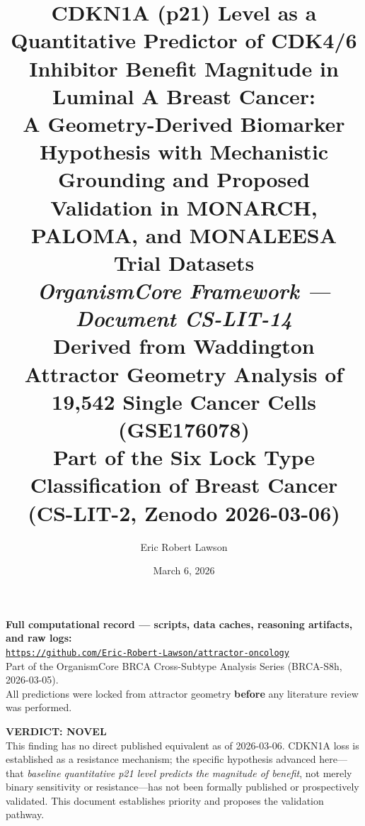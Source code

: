 \documentclass[12pt, a4paper]{article}
\title{
    \vspace{-1em}
    \textbf{CDKN1A (p21) Level as a Quantitative
    Predictor of CDK4/6 Inhibitor Benefit Magnitude
    in Luminal A Breast Cancer:}\\[0.5em]
    \large A Geometry-Derived Biomarker Hypothesis
    with Mechanistic Grounding and Proposed
    Validation in MONARCH, PALOMA, and
    MONALEESA Trial Datasets\\[0.4em]
    \normalsize \textit{OrganismCore Framework ---
    Document CS-LIT-14}\\[0.3em]
    \small Derived from Waddington Attractor Geometry
    Analysis of 19,542 Single Cancer Cells (GSE176078)\\[0.3em]
    \small Part of the Six Lock Type Classification
    of Breast Cancer (CS-LIT-2, Zenodo 2026-03-06)
}
\author[1]{Eric Robert Lawson}
\affil[1]{
    OrganismCore\\
    \href{mailto:OrganismCore@proton.me}
         {OrganismCore@proton.me}\\
    ORCID:
    \href{https://orcid.org/0009-0002-0414-6544}
         {0009-0002-0414-6544}
}
\date{March 6, 2026}
\begin{document}

\maketitle
\thispagestyle{fancy}

\begin{center}
\colorbox{repobox}{
\begin{minipage}{0.88\textwidth}
\vspace{0.5em}
\centering
\textbf{Full computational record --- scripts, data caches,
reasoning artifacts, and raw logs:}\\[0.4em]
\href{https://github.com/Eric-Robert-Lawson/attractor-oncology}
{\texttt{https://github.com/Eric-Robert-Lawson/attractor-oncology}}
\\[0.3em]
\small Part of the OrganismCore BRCA Cross-Subtype
Analysis Series (BRCA-S8h, 2026-03-05).\\
All predictions were locked from attractor geometry
\textbf{before} any literature review was performed.
\vspace{0.5em}
\end{minipage}}
\end{center}

\vspace{1em}

\begin{center}
\colorbox{novelbox}{
\begin{minipage}{0.88\textwidth}
\vspace{0.5em}
\textbf{VERDICT: NOVEL}\\[0.3em]
This finding has no direct published equivalent as of
2026-03-06. CDKN1A loss is established as a resistance
mechanism; the specific hypothesis advanced here---that
\emph{baseline quantitative p21 level predicts the
magnitude of benefit}, not merely binary sensitivity or
resistance---has not been formally published or
prospectively validated. This document establishes
priority and proposes the validation pathway.
\vspace{0.5em}
\end{minipage}}
\end{center}

\vspace{1em}
\end{document}
